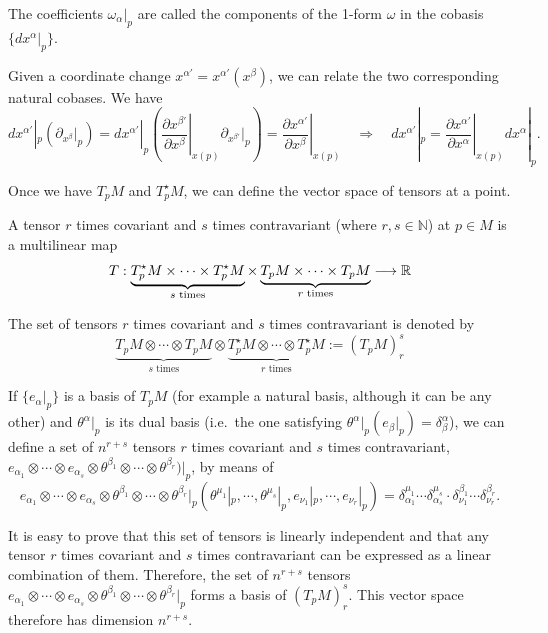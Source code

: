 \begin{points}
\item The coefficients $\omega_\alpha|_p$ are called the components of the 1-form $\omega$ in the cobasis $\{dx^\alpha|_p\}$.

\item Given a coordinate change $x^{\alpha'}=x^{\alpha'}(x^\beta)$, we can relate the two corresponding natural cobases. We have
\[
  dx^{\alpha'}|_p\left(\partial_{x^\beta}|_p\right)=dx^{\alpha'}|_p\left(\left.\frac{\partial x^{\beta'}}{\partial x^\beta}\right|_{x(p)}\partial_{x^{\beta'}}|_p\right)=\left.\frac{\partial x^{\alpha'}}{\partial x^\beta}\right|_{x(p)}
  \quad\Longrightarrow\quad dx^{\alpha'}|_p=\left.\frac{\partial x^{\alpha'}}{\partial x^\alpha}\right|_{x(p)}dx^\alpha|_p .
\]

\item Once we have $T_pM$ and $T^\star_pM$, we can define the vector space of tensors at a point.

\item A tensor $r$ times covariant and $s$ times contravariant (where $r,s\in\mathbb N$) at $p\in M$ is a multilinear map
\[
  T:\underbrace{T^\star_pM\times\cdots\times T^\star_pM}_{s\text{ times}}\times\underbrace{T_pM\times\cdots\times T_pM}_{r\text{ times}}\longrightarrow\mathbb{R}
\]

\item The set of tensors $r$ times covariant and $s$ times contravariant is denoted by
\[
  \underbrace{T_pM\otimes\cdots\otimes T_pM}_{s\text{ times}}\otimes\underbrace{T^\star_pM\otimes\cdots\otimes T^\star_pM}_{r\text{ times}}:=(T_pM)^s_r
\]

\item If $\{e_\alpha|_p\}$ is a basis of $T_pM$ (for example a natural basis, although it can be any other) and $\theta^\alpha|_p$ is its dual basis (i.e.\ the one satisfying $\theta^\alpha|_p(e_\beta|_p)=\delta^\alpha_\beta$), we can define a set of $n^{r+s}$ tensors $r$ times covariant and $s$ times contravariant, $e_{\alpha_1}\otimes\cdots\otimes e_{\alpha_s}\otimes\theta^{\beta_1}\otimes\cdots\otimes\theta^{\beta_r})|_p$, by means of
\[
  e_{\alpha_1}\otimes\cdots\otimes e_{\alpha_s}\otimes\theta^{\beta_1}\otimes\cdots\otimes\theta^{\beta_r}|_p(\theta^{\mu_1}|_p,\cdots,\theta^{\mu_s}|_p,e_{\nu_1}|_p,\cdots,e_{\nu_r}|_p)=\delta^{\mu_1}_{\alpha_1}\cdots\delta^{\mu_s}_{\alpha_s}\cdot\delta^{\beta_1}_{\nu_1}\cdots\delta^{\beta_r}_{\nu_r}.
\]

\item It is easy to prove that this set of tensors is linearly independent and that any tensor $r$ times covariant and $s$ times contravariant can be expressed as a linear combination of them. Therefore, the set of $n^{r+s}$ tensors $e_{\alpha_1}\otimes\cdots\otimes e_{\alpha_s}\otimes\theta^{\beta_1}\otimes\cdots\otimes\theta^{\beta_r}|_p$ forms a basis of $(T_pM)^s_r$. This vector space therefore has dimension $n^{r+s}$.


\end{points}
